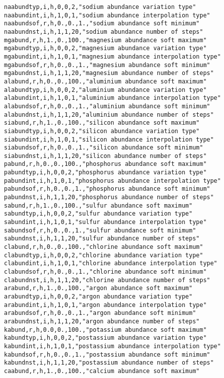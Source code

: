 \begin{verbatim}
naabundtyp,i,h,0,0,2,"sodium abundance variation type"
naabundint,i,h,1,0,1,"sodium abundance interpolation type"
naabundsof,r,h,0.,0.,1.,"sodium abundance soft minimum"
naabundnst,i,h,1,1,20,"sodium abundance number of steps"
mgabund,r,h,1.,0.,100.,"magnesium abundance soft maximum"
mgabundtyp,i,h,0,0,2,"magnesium abundance variation type"
mgabundint,i,h,1,0,1,"magnesium abundance interpolation type"
mgabundsof,r,h,0.,0.,1.,"magnesium abundance soft minimum"
mgabundnst,i,h,1,1,20,"magnesium abundance number of steps"
alabund,r,h,0.,0.,100.,"aluminium abundance soft maximum"
alabundtyp,i,h,0,0,2,"aluminium abundance variation type"
alabundint,i,h,1,0,1,"aluminium abundance interpolation type"
alabundsof,r,h,0.,0.,1.,"aluminium abundance soft minimum"
alabundnst,i,h,1,1,20,"aluminium abundance number of steps"
siabund,r,h,1.,0.,100.,"silicon abundance soft maximum"
siabundtyp,i,h,0,0,2,"silicon abundance variation type"
siabundint,i,h,1,0,1,"silicon abundance interpolation type"
siabundsof,r,h,0.,0.,1.,"silicon abundance soft minimum"
siabundnst,i,h,1,1,20,"silicon abundance number of steps"
pabund,r,h,0.,0.,100.,"phosphorus abundance soft maximum"
pabundtyp,i,h,0,0,2,"phosphorus abundance variation type"
pabundint,i,h,1,0,1,"phosphorus abundance interpolation type"
pabundsof,r,h,0.,0.,1.,"phosphorus abundance soft minimum"
pabundnst,i,h,1,1,20,"phosphorus abundance number of steps"
sabund,r,h,1.,0.,100.,"sulfur abundance soft maximum"
sabundtyp,i,h,0,0,2,"sulfur abundance variation type"
sabundint,i,h,1,0,1,"sulfur abundance interpolation type"
sabundsof,r,h,0.,0.,1.,"sulfur abundance soft minimum"
sabundnst,i,h,1,1,20,"sulfur abundance number of steps"
clabund,r,h,0.,0.,100.,"chlorine abundance soft maximum"
clabundtyp,i,h,0,0,2,"chlorine abundance variation type"
clabundint,i,h,1,0,1,"chlorine abundance interpolation type"
clabundsof,r,h,0.,0.,1.,"chlorine abundance soft minimum"
clabundnst,i,h,1,1,20,"chlorine abundance number of steps"
arabund,r,h,1.,0.,100.,"argon abundance soft maximum"
arabundtyp,i,h,0,0,2,"argon abundance variation type"
arabundint,i,h,1,0,1,"argon abundance interpolation type"
arabundsof,r,h,0.,0.,1.,"argon abundance soft minimum"
arabundnst,i,h,1,1,20,"argon abundance number of steps"
kabund,r,h,0.0,0.,100.,"potassium abundance soft maximum"
kabundtyp,i,h,0,0,2,"postassium abundance variation type"
kabundint,i,h,1,0,1,"postassium abundance interpolation type"
kabundsof,r,h,0.,0.,1.,"postassium abundance soft minimum"
kabundnst,i,h,1,1,20,"postassium abundance number of steps"
caabund,r,h,1.,0.,100.,"calcium abundance soft maximum"

\end{verbatim}
